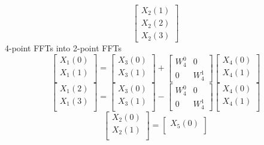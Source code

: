 \documentclass[journal,12pt,twocolumn]{IEEEtran}
\renewcommand\thesection{\arabic{section}}
\begin{document}
\begin{enumerate}[label=\thesection.\arabic*]
\begin{enumerate}[label=\arabic*.,ref=\thesection.\theenumi]
\begin{equation}
\begin{bmatrix}
			X_{2}(1) \\ 
			X_{2}(2) \\
			X_{2}(3)
		\end{bmatrix}
	\end{equation}
	4-point FFTs into 2-point FFTs
	\begin{equation}
		\begin{bmatrix}
			X_{1}(0) \\ 
			X_{1}(1)\\ 
		\end{bmatrix}
		=
		\begin{bmatrix}
			X_{3}(0) \\ 
			X_{3}(1)\\ 
		\end{bmatrix}
		+
		\begin{bmatrix}
			W^{0}_{4} & 0\\
			0 & W^{1}_{4}
		\end{bmatrix}
		\begin{bmatrix}
			X_{4}(0) \\ 
			X_{4}(1) \\ 
		\end{bmatrix}
	\end{equation}
	\begin{equation}
		\begin{bmatrix}
			X_{1}(2) \\ 
			X_{1}(3)\\ 
		\end{bmatrix}
		=
		\begin{bmatrix}
			X_{3}(0) \\ 
			X_{3}(1)\\ 
		\end{bmatrix}
		-
		\begin{bmatrix}
			W^{0}_{4} & 0\\
			0 & W^{1}_{4}
		\end{bmatrix}
		\begin{bmatrix}
			X_{4}(0) \\ 
			X_{4}(1) \\ 
		\end{bmatrix}
	\end{equation}
	\begin{equation}
		\begin{bmatrix}
			X_{2}(0) \\ 
			X_{2}(1)\\ 
		\end{bmatrix}
		=
		\begin{bmatrix}
			X_{5}(0) \\ 

\end{bmatrix}
\end{equation}
\end{enumerate}
\end{enumerate}
\end{document}
